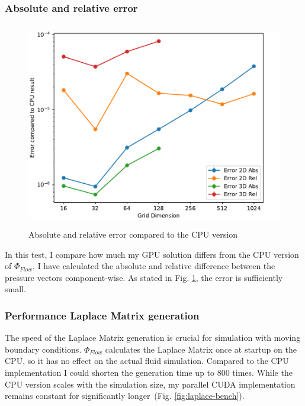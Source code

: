 \subsubsection{Absolute and relative error}
\begin{figure}[t]
\centering
	\includegraphics[height=9cm, width=14cm]{figures/error}
\caption{Absolute and relative error compared to the CPU version} \label{fig:error}
\end{figure}
In this test, I compare how much my GPU solution differs from the CPU version of $\Phi_{Flow}$. I have calculated the absolute and relative difference between the pressure vectors component-wise. As stated in Fig. \ref{fig:error}, the error is sufficiently small.

\clearpage
\subsubsection{Performance Laplace Matrix generation}
The speed of the Laplace Matrix generation is crucial for simulation with moving boundary conditions. $\Phi_{Flow}$ calculates the Laplace Matrix once at startup on the CPU, so it has no effect on the actual fluid simulation. Compared to the CPU implementation I could shorten the generation time up to 800 times. While the CPU version scales with the simulation size, my parallel CUDA implementation remains constant for significantly longer (Fig. \ref{fig:laplace-bench}).

